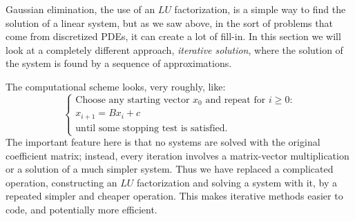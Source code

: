 
Gaussian elimination, the use of an $LU$ factorization, is a simple
way to find the solution of a
linear system, but as we saw above, in
the sort of problems that come from discretized \ac{PDE}s, it can 
create a lot of fill-in. In this section we will look at a completely
different approach,
\emph{iterative solution},
where the solution of the system is found
by a sequence of approximations.

The computational scheme looks, very roughly, like:
\[
\begin{cases}
  \mbox{Choose any starting vector $x_0$ and repeat for $i\geq0$:}\\
  x_{i+1}=Bx_i+c\\
  \mbox{until some stopping test is satisfied.}
\end{cases}
\]
The important feature here is that no systems are solved with the
original coefficient matrix; instead,
every iteration involves a matrix-vector multiplication or a solution
of a much simpler system. Thus
we have replaced a complicated operation, constructing an $LU$
factorization and solving a system with it, by a repeated simpler
and cheaper operation. This makes iterative methods easier to code,
and potentially more efficient.

